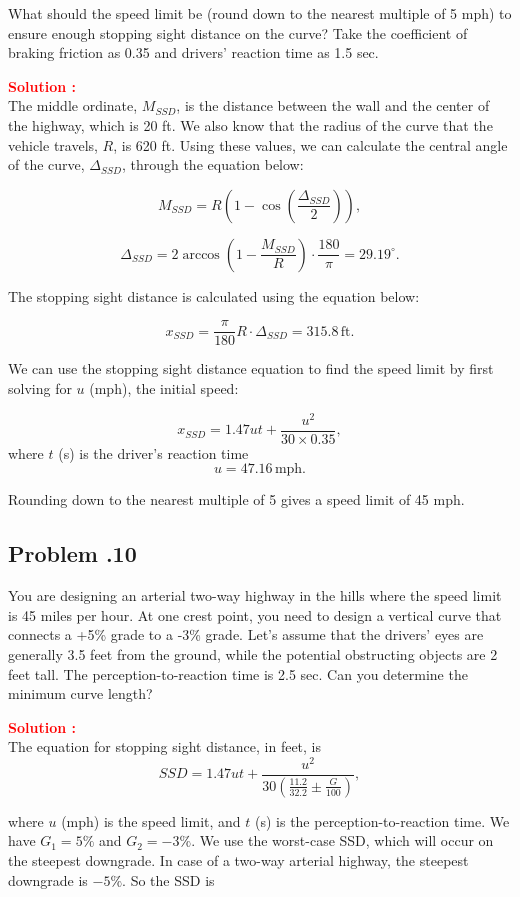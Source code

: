 \documentclass[12pt]{article}
\newcommand{\customsubsection}[1]{
  \subsection*{Problem \thesection.#1}
}
\begin{document}
What should the speed limit be (round down to the nearest multiple of 5 mph) to ensure enough stopping sight distance on the curve? Take the coefficient of braking friction as 0.35 and drivers’ reaction time as 1.5 sec.

\textbf{\textcolor{red}{Solution :}} \\
The middle ordinate, \(M_{SSD}\), is the distance between the wall and the center of the highway, which is 20 ft. We also know that the radius of the curve that the vehicle travels, $R$, is 620 ft. Using these values, we can calculate the central angle of the curve, $\Delta_{SSD}$, through the equation below:

\[
M_{SSD} = R \left(1 - \cos\left(\frac{\Delta_{SSD}}{2}\right)\right),
\]

\[
\Delta_{SSD} = 2 \arccos \left(1 - \frac{M_{SSD}}{R}\right) \cdot \frac{180}{\pi} = 29.19^{\circ}.
\]

The stopping sight distance is calculated using the equation below:

\[
x_{SSD} = \frac{\pi}{180} R \cdot \Delta_{SSD} = 315.8 \, \text{ft}.
\]

We can use the stopping sight distance equation to find the speed limit by first solving for \(u\) (mph), the initial speed:

\[
x_{SSD} = 1.47ut + \frac{u^2}{30 \times 0.35},
\]
where $t$ (s) is the driver's reaction time
\[
u = 47.16 \, \text{mph}.
\]

Rounding down to the nearest multiple of 5 gives a speed limit of 45 mph.

\newpage


\customsubsection{10}
You are designing an arterial two-way highway in the hills where the speed limit is 45 miles per hour. At one crest point, you need to design a vertical curve that connects a +5\% grade to a -3\% grade. Let’s assume that the drivers’ eyes are generally 3.5 feet from the ground, while the potential obstructing objects are 2 feet tall. The perception-to-reaction time is 2.5 sec. Can you determine the minimum curve length?


\textbf{\textcolor{red}{Solution :}} \\

The equation for stopping sight distance, in feet, is
\[
SSD = 1.47ut + \frac{u^2}{30\left(\frac{11.2}{32.2} \pm \frac{G}{100}\right)},
\]

where $u$ (mph) is the speed limit, and $t$ (s) is the perception-to-reaction time. We have $G_1 = 5 \%$ and $G_2 = -3 \%$. We use the worst-case SSD, which will occur on the steepest downgrade. In case of a two-way arterial highway, the steepest downgrade is $-5\%$. So the SSD is
\end{document}
